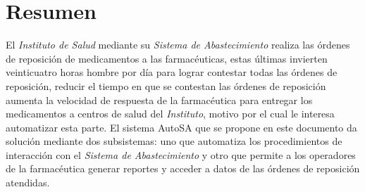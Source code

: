\section{Resumen}
El \textit{Instituto de Salud} mediante su \textit{Sistema de Abastecimiento} realiza las órdenes de reposición de medicamentos a las farmacéuticas, estas últimas invierten veinticuatro horas hombre por día para lograr contestar todas las órdenes de reposición, reducir el tiempo en que se contestan las órdenes de reposición aumenta la velocidad de respuesta de la farmacéutica para entregar los medicamentos a centros de salud del \textit{Instituto}, motivo por el cual le interesa automatizar esta parte. El sistema AutoSA que se propone en este documento da solución mediante dos subsistemas: uno que automatiza los procedimientos de interacción con el \textit{Sistema de Abastecimiento} y otro que permite a los operadores de la farmacéutica generar reportes y acceder a datos de las órdenes de reposición atendidas.